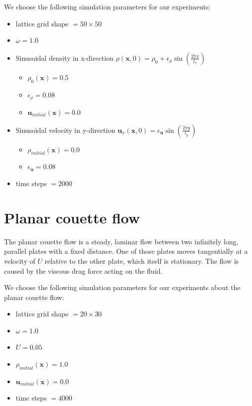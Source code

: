 \documentclass[a4paper,11pt, footsepline]{book}
\begin{document}
We choose the following simulation parameters for our experiments:
\begin{itemize}
\setlength\itemsep{0.15em}
\item lattice grid shape $=50\times 50$
\item $\omega=1.0$
\item Sinusoidal density in x-direction $\rho(\mathbf{x},0)=\rho_{0}+\epsilon_{\rho}\sin(\frac{2\pi x}{l_x})$
\begin{itemize}
\setlength\itemsep{0.1em}
\item $\rho_{0}(\mathbf{x})=0.5$
\item $\epsilon_{\rho}=0.08$
\item $\mathbf{u}_{initial}(\mathbf{x})=0.0$
\end{itemize}
\item Sinusoidal velocity in y-direction $\mathbf{u}_{x}(\mathbf{x},0)=\epsilon_{\mathbf{u}}\sin(\frac{2\pi y}{l_y})$
\begin{itemize}
\setlength\itemsep{0.1em}
\item $\rho_{initial}(\mathbf{x})=0.0$
\item $\epsilon_{\mathbf{u}}=0.08$
\end{itemize}
\item time steps $=2000$
\end{itemize}
\section{Planar couette flow}\label{sec-couette}
The planar couette flow is a steady, laminar flow between two infinitely long, parallel plates with a fixed distance. One of those plates moves tangentially at a velocity of $U$ relative to the other plate, which itself is stationary. The flow is caused by the viscous drag force acting on the fluid.

We choose the following simulation parameters for our experiments about the planar couette flow:
\begin{itemize}
\setlength\itemsep{0.15em}
\item lattice grid shape $=20\times 30$
\item $\omega=1.0$
\item $U=0.05$
\item $\rho_{initial}(\mathbf{x})=1.0$
\item $\mathbf{u}_{initial}(\mathbf{x})=0.0$
\item time steps $=4000$
\end{itemize}
\end{document}
